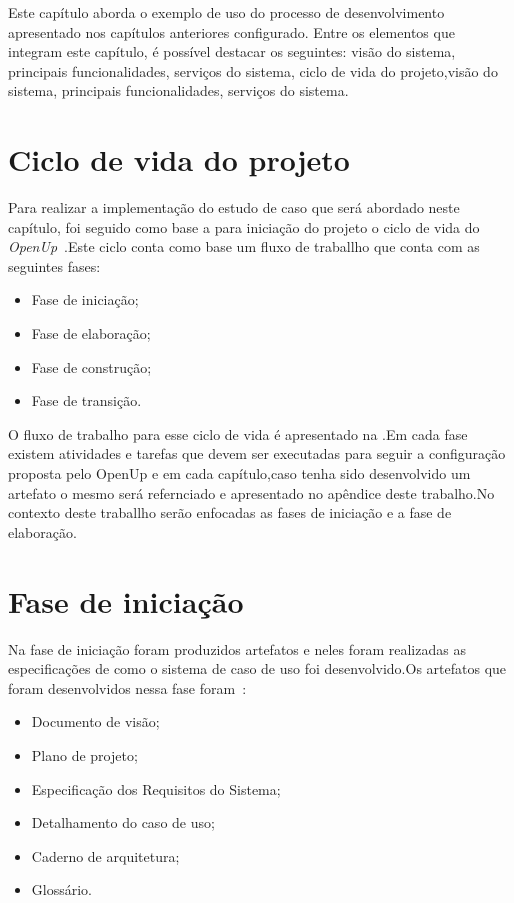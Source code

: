 Este capítulo aborda o exemplo de uso do processo de desenvolvimento apresentado nos capítulos anteriores configurado. Entre os elementos que integram este capítulo, é possível destacar os seguintes: visão do sistema, principais funcionalidades, serviços do sistema, ciclo de vida do projeto,visão do sistema, principais funcionalidades, serviços do sistema.


\section{Ciclo de vida do projeto}
Para realizar a implementação do estudo de caso que será abordado neste capítulo, foi seguido como base a para iniciação do projeto o ciclo de vida do \emph{OpenUp}~\cite{openup}.Este ciclo conta como base um fluxo de traballho que conta com as seguintes fases:
\begin{itemize}
    \item Fase de iniciação;
    \item Fase de elaboração;
    \item Fase de construção;
    \item Fase de transição.
\end{itemize}

%

O fluxo de trabalho para esse ciclo de vida é apresentado na .Em cada fase existem atividades e tarefas que devem ser executadas para seguir a configuração proposta pelo OpenUp e em cada capítulo,caso tenha sido desenvolvido um artefato o mesmo será refernciado e apresentado no apêndice deste trabalho.No contexto deste traballho serão enfocadas as fases de iniciação e a fase de elaboração.

\section{Fase de iniciação}

Na fase de iniciação foram produzidos artefatos e neles foram realizadas as especificações de como o sistema de caso de uso foi desenvolvido.Os artefatos que foram desenvolvidos nessa fase foram~\cite{openup}:
\begin{itemize}
    \item Documento de visão;
    \item Plano de projeto;
    \item Especificação dos Requisitos do Sistema;
    \item Detalhamento do caso de uso;
    \item Caderno de arquitetura;
    \item Glossário.
\end{itemize}

